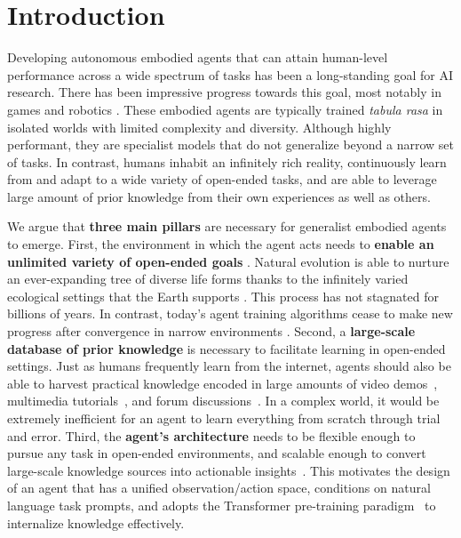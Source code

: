 \section{Introduction}
\label{sec:introduction}

Developing autonomous embodied agents that can attain human-level performance across a wide spectrum of tasks has been a long-standing goal for AI research. There has been impressive progress towards this goal, most notably in games \cite{mnih2013playing, openai2019dota, vinyals2019alphastar} and robotics \cite{kolve2017ai2thor, savva2019habitat, zhu2020robosuite, xia2019igibson0.5, shen2020igibson}. These embodied agents are typically trained \textit{tabula rasa} in isolated worlds with limited complexity and diversity. Although highly performant, they are specialist models that do not generalize beyond a narrow set of tasks. 
In contrast, humans inhabit an infinitely rich reality, continuously learn from and adapt to a wide variety of open-ended tasks, and are able to leverage large amount of prior knowledge from their own experiences as well as others.  

We argue that \textbf{three main pillars} are necessary for generalist embodied agents to emerge. First, the environment in which the agent acts needs to \textbf{enable an unlimited variety of open-ended goals} \cite{standish2003open, langdon2005pfeiffer, taylor2016open, stanley2017open}. Natural evolution is able to nurture an ever-expanding tree of diverse life forms thanks to the infinitely varied ecological settings that the Earth supports \cite{stanley2017open, wang2019paired}. This process has not stagnated for billions of years. In contrast, today's agent training algorithms cease to make new progress after convergence in narrow environments \cite{mnih2013playing,zhu2020robosuite}.
Second, a \textbf{large-scale database of prior knowledge} is necessary to facilitate learning in open-ended settings. Just as humans frequently learn from the internet, agents should also be able to harvest practical knowledge encoded in large amounts of video demos~\cite{goyal2017something, miech2019howto100m}, multimedia tutorials~\cite{minecraftwiki}, and forum discussions~\cite{volske-etal-2017-tl, DBLP:conf/naacl/KimKK19, henderson2019repository}. In a complex world, it would be extremely inefficient for an agent to learn everything from scratch through trial and error.  
Third, the \textbf{agent's architecture} needs to be flexible enough to pursue any task in open-ended environments, and scalable enough to convert large-scale knowledge sources into actionable insights~\cite{ranzato2021decisiontransformer,reid2022wikipedia}. This motivates the design of an agent that has a unified observation/action space, conditions on natural language task prompts, and adopts the Transformer pre-training paradigm~\cite{devlin2018bert,radford2019gpt2, brown2020gpt3} to internalize knowledge effectively. 

